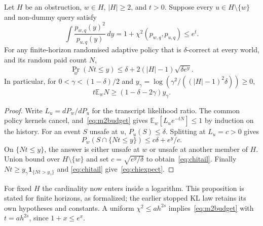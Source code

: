 \begin{proposition}
\label{prop:chistar}
Let $H$ be an obstruction, $w\in H$, $|H|\ge2$, and $t>0$. Suppose every $u\in H\setminus\{w\}$
and non-dummy query satisfy
\begin{equation}
\int\frac{p_{w,q}(y)^2}{p_{u,q}(y)}\,dy
=1+\chi^2(p_{w,q},p_{u,q})\le e^t.
\label{eq:m2budget}
\end{equation}
For any finite-horizon randomised adaptive policy that is $\delta$-correct at every world,
and its random paid count $N$,
\begin{equation}
\Pr_w(Nt\le y)\le\delta+2(|H|-1)\sqrt{\delta e^y}.
\label{eq:chitail}
\end{equation}
In particular, for $0<\gamma<(1-\delta)/2$ and
$y_\gamma=\log(\gamma^2/((|H|-1)^2\delta))\ge0$,
\begin{equation}
t\mathbb E_w N\ge(1-\delta-2\gamma)y_\gamma.
\label{eq:chiexpect}
\end{equation}
\end{proposition}
\begin{proof}
Write $L_u=dP_w/dP_u$ for the transcript likelihood ratio. The common policy kernels
cancel, and~\eqref{eq:m2budget} gives
$\mathbb E_w[L_u e^{-tN}]\le1$ by induction on the history. For an event $S$ unsafe at $u$,
$P_u(S)\le\delta$. Splitting at $L_u=c>0$ gives
\[
P_w(S\cap\{Nt\le y\})\le c\delta+e^y/c.
\]
On $\{Nt\le y\}$, the answer is either unsafe at $w$ or unsafe at another member of $H$.
Union bound over $H\setminus\{w\}$ and set $c=\sqrt{e^y/\delta}$ to
obtain~\eqref{eq:chitail}. Finally $Nt\ge y_\gamma\mathbf1_{\{Nt>y_\gamma\}}$ and
\eqref{eq:chitail} give~\eqref{eq:chiexpect}.
\end{proof}
For fixed $H$ the cardinality now enters inside a logarithm. This proposition is stated for
finite horizons, as formalized; the earlier stopped KL law retains its own hypotheses and
constants. A uniform $\chi^2\le a h^{2s}$ implies~\eqref{eq:m2budget} with $t=a h^{2s}$,
since $1+x\le e^x$.

